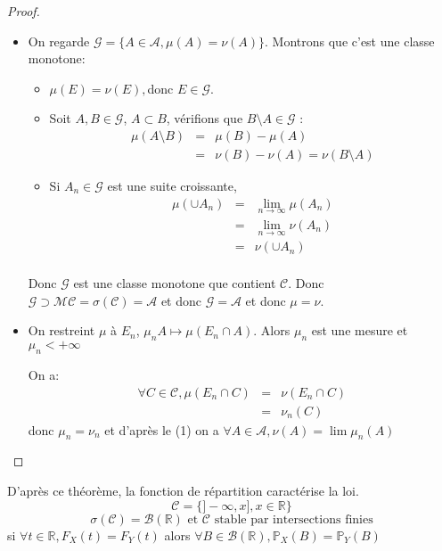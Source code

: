 \begin{proof}
	\begin{itemize}
		\item On regarde $\mathscr{G} = \{A \in \mathscr{A}, \mu(A) = \nu(A)\}$. Montrons que c'est une classe monotone:
		      \begin{itemize}
			      \item $\mu (E) = \nu (E), $donc $E\in \mathscr{G}$.
			      \item Soit $A,B \in \mathscr{G}$, $A\subset B $, vérifions que $B\setminus A \in \mathscr{G}$ :
			            \begin{eqnarray*}
				            \mu(A \setminus B ) &=& \mu(B)- \mu(A) \\
				            &=& \nu (B) - \nu(A) = \nu (B\setminus A)
			            \end{eqnarray*}
			      \item Si $A_n \in \mathscr{G}$ est une suite croissante,
			            \begin{eqnarray*}
				            \mu(\cup A_n) &=& \lim\limits_{n \to \infty} \mu(A_n) \\
				            &=& \lim\limits_{n \to \infty} \nu(A_n) \\
				            &=& \nu(\cup A_n) \\
			            \end{eqnarray*}
		      \end{itemize}
		      Donc $\mathscr{G}$ est une classe monotone que contient $\mathscr{C}$.
		      Donc $\mathscr{G} \supset\mathscr{M}\mathscr{C} = \sigma(\mathscr{C}) = \mathscr{A}$ et
		      donc $\mathscr{G} = \mathscr{A}$ et donc $\mu = \nu$.
		\item
		      On restreint $\mu$ à $E_n$, $\mu_n A \mapsto \mu(E_n \cap A)$.
		      Alors $\mu_n$ est une mesure et $\mu_n < +\infty$

		      On a:
		      \begin{eqnarray*}
			      \forall C \in \mathscr{C}, \mu (E_n \cap C) &=& \nu (E_n \cap C) \\
			      &=& \nu_n(C)
		      \end{eqnarray*}
		      donc $\mu_n = \nu_n$ et d'après le (1) on a $\forall A \in \mathscr{A}, \nu(A) = \lim \mu_n(A)$
	\end{itemize}
\end{proof}


\begin{remarque}
	D'après ce théorème, la fonction de répartition caractérise la loi.
	$$ \mathscr{C} = \{ ]-\infty, x], x \in \mathbb{R} \} $$
	$$ \sigma(\mathscr{C}) = \mathscr{B}(\mathbb{R}) \text{ et } \mathscr{C} \text{ stable par intersections finies}$$
	si $\forall t \in \mathbb{R}, F_X(t) = F_Y(t)$ alors $\forall B \in \mathscr{B}(\mathbb{R}), \mathbb{P}_X(B) = \mathbb{P}_Y(B)$
\end{remarque}

